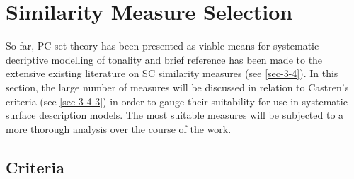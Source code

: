 \documentclass{article}
\begin{document}
\section{Similarity Measure Selection}
\label{sec-6}

So far, PC-set theory has been presented as viable means for
systematic decriptive modelling of tonality and brief reference has
been made to the extensive existing literature on SC similarity
measures (see \ref{sec-3-4}). In this section, the large number
of measures will be discussed in relation to Castren's criteria (see
\ref{sec-3-4-3}) in order to gauge their suitability for use in
systematic surface description models. The most suitable measures will
be subjected to a more thorough analysis over the course of the work.
\subsection{Criteria}
\label{sec-6-1}
\end{document}
